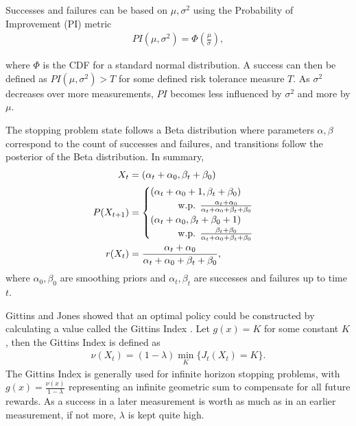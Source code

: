 Successes and failures can be based on $\mu, \sigma^2$ using the Probability of Improvement (PI) metric
\begin{align}
  PI(\mu, \sigma^2) = \Phi(\frac{\mu}{\sigma}),
\end{align}

where $\Phi$ is the CDF for a standard normal distribution. A success can then be defined as $PI(\mu, \sigma^2) > T$ for some defined risk tolerance measure $T$. As $\sigma^2$ decreases over more measurements, $PI$ becomes less influenced by $\sigma^2$ and more by $\mu$. 

The stopping problem state follows a Beta distribution where parameters $\alpha,\beta$ correspond to the count of successes and failures, and transitions follow the posterior of the Beta distribution. In summary,
\begin{align}
\begin{split}
  X_t &= (\alpha_t + \alpha_0, \beta_t + \beta_0) \\
  P(X_{t+1}) &=
  \begin{cases}
      (\alpha_t + \alpha_0 + 1, \beta_t + \beta_0)
      \\ \hspace*{1cm}\text{w.p. } \frac{\alpha_t + \alpha_0}{\alpha_t + \alpha_0 + \beta_t + \beta_0}\\
      (\alpha_t + \alpha_0, \beta_t + \beta_0 + 1)
      \\ \hspace*{1cm}\text{w.p. } \frac{\beta_t + \beta_0}{\alpha_t + \alpha_0 + \beta_t + \beta_0}
  \end{cases}\\
  r(X_t) &= \frac{\alpha_t + \alpha_0}{\alpha_t + \alpha_0 + \beta_t + \beta_0},\\
\end{split}
\end{align}
where $\alpha_0,\beta_0$ are smoothing priors and $\alpha_t,\beta_t$ are successes and failures up to time $t$.

Gittins and Jones showed that an optimal policy could be constructed by calculating a value called the Gittins Index \citep{doi:10.1002/9781118596333.ch24}. Let $g(x) = K$ for some constant $K$, then the Gittins Index is defined as
\begin{align}
  \nu(X_t) = (1-\lambda)\min_{K} \{J_t(X_t) = K\}.
\end{align}
The Gittins Index is generally used for infinite horizon stopping problems, with $g(x)=\frac{\nu(x)}{1-\lambda}$ representing an infinite geometric sum to compensate for all future rewards. As a success in a later measurement is worth as much as in an earlier measurement, if not more, $\lambda$ is kept quite high.

